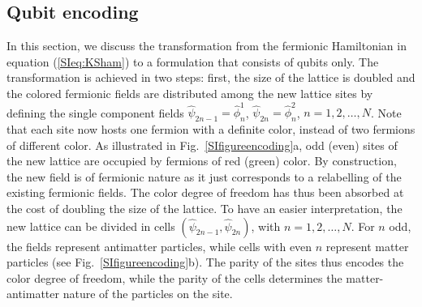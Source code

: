\documentclass[twocolumn,aps,showpacs,prb,superscriptaddress,floatfix,10pt,nofootinbib]{revtex4-2}
\begin{document}
\subsection{Qubit encoding}
\label{SI:qubit}
In this section, we discuss the transformation from the fermionic Hamiltonian in equation (\ref{SIeq:KSham}) to a formulation that consists of qubits only. The transformation is achieved in two steps: first, the size of the lattice is doubled and the colored fermionic fields are distributed among the new lattice sites by defining the single component fields $\hat{\psi}_{2n-1}=\hat{\phi}_{n}^{1}$, $\hat{\psi}_{2n}=\hat{\phi}_{n}^{2}$, $n=1,2,\dots,N$. Note that each site now hosts one fermion with a definite color, instead of two fermions of different color.
As illustrated in Fig.~\ref{SIfigureencoding}a, odd (even) sites of the new lattice are occupied by fermions of red (green) color. By construction, the new field is of fermionic nature as it just corresponds to a relabelling of the existing fermionic fields. The color degree of freedom has thus been absorbed at the cost of doubling the size of the lattice. To have an easier interpretation, the new lattice can be divided in cells $(\hat{\psi}_{2n-1},\hat{\psi}_{2n})$, with $n=1,2,\dots,N$. For $n$ odd, the fields represent antimatter particles, while cells with even $n$ represent matter particles (see Fig.~\ref{SIfigureencoding}b). The parity of the sites thus encodes the color degree of freedom, while the parity of the cells determines the matter-antimatter nature of the particles on the site.
\end{document}
